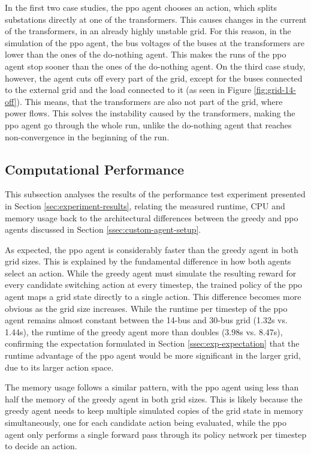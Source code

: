 In the first two case studies, the \ac{ppo} agent chooses an action, which splits substations directly at one of the transformers. This causes changes in the current of the transformers, in an already highly unstable grid. For this reason, in the simulation of the \ac{ppo} agent, the bus voltages of the buses at the transformers are lower than the ones of the do-nothing agent. This makes the runs of the \ac{ppo} agent stop sooner than the ones of the do-nothing agent. On the third case study, however, the agent cuts off every part of the grid, except for the buses connected to the external grid and the load connected to it (as seen in Figure \ref{fig:grid-14-off}). This means, that the transformers are also not part of the grid, where power flows. This solves the instability caused by the transformers, making the \ac{ppo} agent go through the whole run, unlike the do-nothing agent that reaches non-convergence in the beginning of the run.


\subsection{Computational Performance}\label{ssec:computational-performance}
This subsection analyses the results of the performance test experiment presented in Section \ref{sec:experiment-results}, relating the measured runtime, CPU and memory usage back to the architectural differences between the greedy and \ac{ppo} agents discussed in Section \ref{ssec:custom-agent-setup}.

As expected, the \ac{ppo} agent is considerably faster than the greedy agent in both grid sizes. This is explained by the fundamental difference in how both agents select an action. While the greedy agent must simulate the resulting reward for every candidate switching action at every timestep, the trained policy of the \ac{ppo} agent maps a grid state directly to a single action. This difference becomes more obvious as the grid size increases. While the runtime per timestep of the \ac{ppo} agent remains almost constant between the 14-bus and 30-bus grid (1.32s vs. 1.44s), the runtime of the greedy agent more than doubles (3.98s vs. 8.47s), confirming the expectation formulated in Section \ref{ssec:exp-expectation} that the runtime advantage of the \ac{ppo} agent would be more significant in the larger grid, due to its larger action space.

The memory usage follows a similar pattern, with the \ac{ppo} agent using less than half the memory of the greedy agent in both grid sizes. This is likely because the greedy agent needs to keep multiple simulated copies of the grid state in memory simultaneously, one for each candidate action being evaluated, while the \ac{ppo} agent only performs a single forward pass through its policy network per timestep to decide an action.

